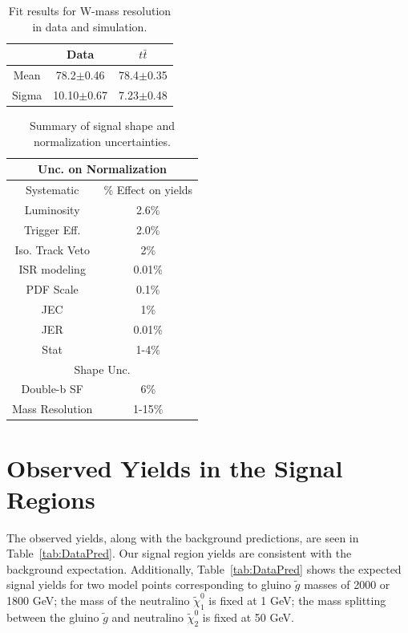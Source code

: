 \begin{table}[hbp!]
\caption{Fit results for W-mass resolution in data and simulation.}
\label{tab:WMassFit}
\centering
\begin{tabular}{c||c|c}
\hline
\hline
 & Data & $t\bar{t}$\\
\hline
Mean & 78.2$\pm$0.46 & 78.4$\pm$0.35\\
Sigma & 10.10$\pm$0.67 & 7.23$\pm$0.48\\
\hline
\hline
\end{tabular}
\end{table}

\begin{table}[hbp!]
\centering
\begin{tabular}{c|c}
\hline \hline
\multicolumn{2}{c}{Unc. on Normalization} \\  \hline
\hline \hline
Systematic & \% Effect on yields\\ \hline
Luminosity & 2.6\% \\ \hline
Trigger Eff. & 2.0\% \\ \hline
Iso. Track Veto & 2\%\\ \hline
ISR modeling & 0.01\% \\ \hline
PDF Scale & 0.1\% \\ \hline
JEC & 1\% \\ \hline
JER & 0.01\% \\ \hline
 Stat & 1-4\% \\ \hline
\multicolumn{2}{c}{Shape Unc.} \\  \hline
Double-b SF & 6\% \\ \hline
Mass Resolution &1-15\% \\ \hline
\hline
\end{tabular}
\caption{
    Summary of signal shape and normalization uncertainties. 
}
\label{tab:SignalSystSummary}
\end{table}

\section{Observed Yields in the Signal Regions}
\label{sec:results}

The observed yields, along with the background predictions, are seen in Table~\ref{tab:DataPred}. Our signal region yields are consistent with the background expectation. Additionally, Table~\ref{tab:DataPred} shows the expected signal yields for two model points corresponding to gluino $\tilde{g}$ masses of 2000 or 1800 GeV; the mass of the neutralino $\tilde{\chi}_{1}^{0}$ is fixed at 1 GeV; the mass splitting between the gluino $\tilde{g}$ and neutralino $\tilde{\chi}_{2}^{0}$ is fixed at 50 GeV.

